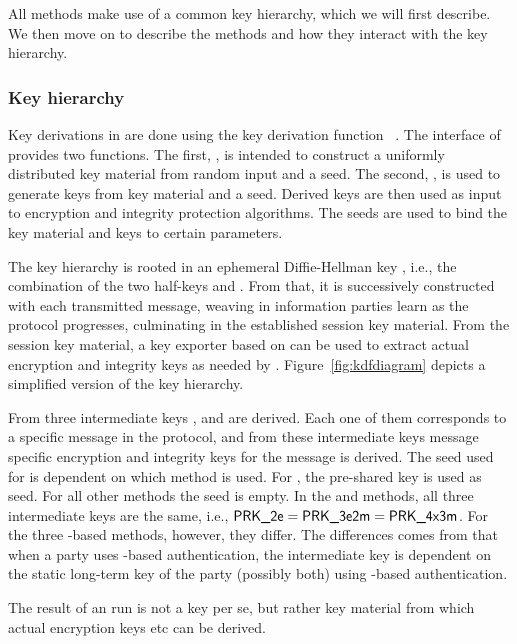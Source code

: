 All methods make use of a common key hierarchy, which we will first describe.
%
We then move on to describe the methods and how they interact with the
key hierarchy.
%

\subsubsection{Key hierarchy}
\label{sec:keyHierarchy}
Key derivations in \mEdhoc{} are done using the key derivation function
\mHkdf{}~\cite{rfc5869}.
%
The interface of \mHkdf{} provides two functions.
%
The first, \mHkdfExtract{}, is intended to construct a uniformly distributed
key material from random input and a seed.
%
The second, \mHkdfExpand{}, is used to generate keys from key material and a
seed.
%
Derived keys are then used as input to encryption and integrity protection
algorithms.
%
The seeds are used to bind the key material and keys to certain parameters.
%

The key hierarchy is rooted in an ephemeral Diffie-Hellman key \mGxy{}, i.e.,
the combination of the two half-keys \mGx{} and \mGy{}.
%
From that, it is successively constructed with each transmitted message, weaving
in information parties learn as the protocol progresses, culminating in the
established session key material.
%
From the session key material, a key exporter based on \mHkdf{} can be used to
extract actual encryption and integrity keys as needed by \mOscore{}.
%
Figure~\ref{fig:kdfdiagram} depicts a simplified version of the key hierarchy.
%

From \mGxy{} three intermediate keys \mPRKtwo, \mPRKthree{} and
\mPRKthree are derived.
%
Each one of them corresponds to a specific message in the protocol, and from
these intermediate keys message specific encryption and integrity keys for the
message is derived.
%
The seed used for \mPRKtwo{} is dependent on which method is used.
%
For \mPskPsk{}, the pre-shared key is used as seed.
%
For all other methods the seed is empty.
%
In the \mPskPsk{} and \mSigSig{} methods, all three intermediate keys
are the same, i.e., $\text{\textup{\textsf{PRK\_2e}}}{} = \text{\textup{\textsf{PRK\_3e2m}}}{} = \text{\textup{\textsf{PRK\_4x3m}}}$.
%
For the three \mStat-based methods, however, they differ.
%
The differences comes from that when a party uses \mStat{}-based authentication,
the intermediate key \mPRKthree{} is dependent on the static long-term key of
the party (possibly both) using \mStat{}-based authentication.
%

The result of an \mEdhoc{} run is not a key per se, but rather key material from
which actual encryption keys etc can be derived.
%


